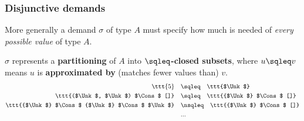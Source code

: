 \begin{frame}[fragile]
\frametitle{Disjunctive demands}

More generally a demand $\sigma$ of type $A$ must specify how much is
needed of \emph{every possible value} of type $A$.

\vspace{10pt}
\pause

$\sigma$ represents a \textbf{partitioning} of $A$ into
\textbf{$\sqleq$-closed subsets}, where $u \sqleq v$ means $u$ is
\textbf{approximated by} (matches fewer values than) $v$.
\begin{align*}
\ttt{5}
& \quad\sqleq\quad
\ttt{$\Unk$}
\\
\ttt{($\Unk$, $\Unk$) $\Cons$ []}
& \quad\sqleq\quad
\ttt{{$\Unk$} $\Cons$ []}
\\
\ttt{{$\Unk$} $\Cons$ {$\Unk$} $\Cons$ $\Unk$}
& \quad\nsqleq\quad
\ttt{{$\Unk$} $\Cons$ []}
\\
& \quad...
\end{align*}
\end{frame}
